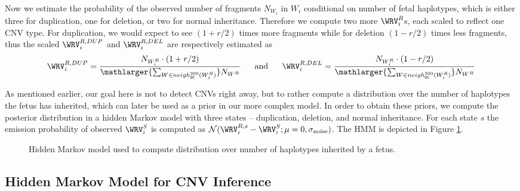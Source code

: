 Now we estimate the probability of the observed number of fragments $N_{W_i}$ in $W_i$ conditional on number of fetal haplotypes, which is either three for duplication, one for deletion, or two for normal inheritance. Therefore we compute two more $\WRV_i^R$s, each scaled to reflect one CNV type. For duplication, we would expect to see $(1+r/2)$ times more fragments while for deletion $(1-r/2)$ times less fragments, thus the scaled $\WRV_i^{R,DUP}$ and $\WRV_i^{R,DEL}$ are respectively estimated as
\begin{align*}
\WRV_i^{R,DUP} = \frac{ N_{W_i^R} \cdot (1+r/2) }{ \mathlarger{\sum_{W \in neigh_{\G\C}^{200}(W_i^R)}} N_{W^R} }
\text{ ~~~~and~~~~ }
\WRV_i^{R,DEL} = \frac{ N_{W_i^R} \cdot (1-r/2) }{ \mathlarger{\sum_{W \in neigh_{\G\C}^{200}(W_i^R)}} N_{W^R} }
\end{align*}

As mentioned earlier, our goal here is not to detect CNVs right away, but to rather compute a distribution over the number of haplotypes the fetus has inherited, which can later be used as a prior in our more complex model. In order to obtain these priors, we compute the posterior distribution in a hidden Markov model with three states -- duplication, deletion, and normal inheritance. For each state $s$ the emission probability of observed $\WRV_i^S$ is computed as $\N(\WRV_i^{R,s}-\WRV_i^S; \mu=0, \sigma_{\text{noise}})$. The HMM is depicted in Figure \ref{fig:hmm_coverage}.

\begin{figure}[h]
\caption{Hidden Markov model used to compute distribution over number of haplotypes inherited by a fetus.}\label{fig:hmm_coverage}
\end{figure}

\subsection{Hidden Markov Model for CNV Inference}\label{ss:hmm}

